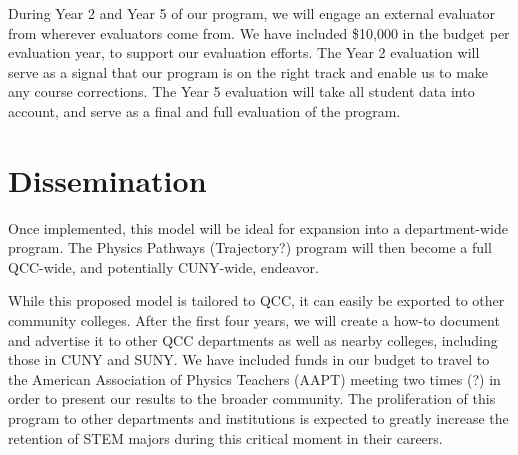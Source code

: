\documentclass[12pt]{article}
\newcommand\new[1]{{\color{blue}#1}}
\begin{document}
During Year 2 and Year 5 of our program, we will engage an external evaluator from \new{wherever evaluators come from.}  We have included \$10,000 in the budget per evaluation year, to support our evaluation efforts.  The Year 2 evaluation will serve as a signal that our program is on the right track and enable us to make any course corrections.  The Year 5 evaluation will take all student data into account, and serve as a final and full evaluation of the program.

\section{Dissemination}

Once implemented, this model will be ideal for expansion into a department-wide program.  
The Physics Pathways (Trajectory?) program will then become a full QCC-wide, and potentially CUNY-wide, endeavor.

While this proposed model is tailored to QCC, it can easily be exported to other community colleges.  After the first four years, we will create a how-to document and advertise it to other QCC departments as well as nearby colleges, including those in CUNY and SUNY.  We have included funds in our budget to travel to the American Association of Physics Teachers (AAPT) meeting \new{two times (?)} in order to present our results to the broader community.  The proliferation of this program to other departments and institutions is expected to greatly increase the retention of STEM majors during this critical moment in their careers.
\end{document}
